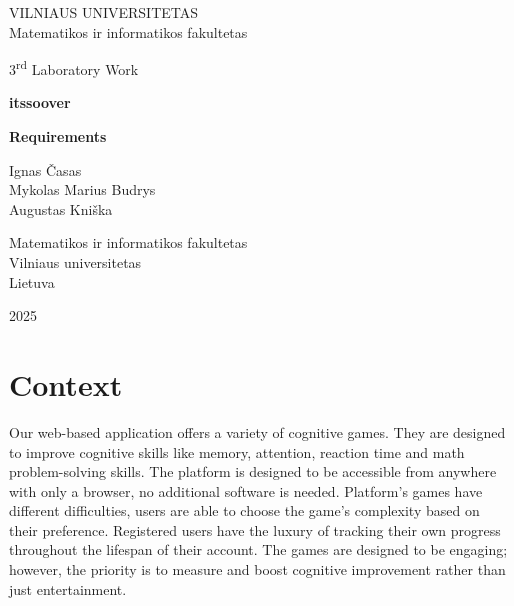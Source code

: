 \documentclass[11pt,a4paper]{article}
\begin{document}

\begin{titlepage}
    \centering
    \thispagestyle{empty}
    
    {\Large VILNIAUS UNIVERSITETAS\\
    Matematikos ir informatikos fakultetas}\par
    
    \vspace{3cm} %
    
    {\Large 3\textsuperscript{rd} Laboratory Work}\par
    \vspace{0.5cm}
    {\Large \textbf{itssoover}}\par
    {\Large \textbf{Requirements}}\par
    
    \vspace{3cm}
    
    {\large
    Ignas Časas\\
    Mykolas Marius Budrys\\
    Augustas Kniška
    }\par
    
    \vspace{8cm}
    
    {\large
    Matematikos ir informatikos fakultetas\\
    Vilniaus universitetas\\
    Lietuva
    }\par
    \vfill

    \large 2025
    
\end{titlepage}

\tableofcontents
\newpage

\section{Context}
Our web-based application offers a variety of cognitive games. They are designed to improve cognitive skills like memory, attention, reaction time and math problem-solving skills. The platform is designed to be  accessible from anywhere with only a browser, no additional software is needed. Platform's games have different difficulties, users are able to choose the game's complexity based on their preference. Registered users have the luxury of tracking their own progress throughout the lifespan of their account. The games are designed to be engaging; however, the priority is to measure and boost cognitive improvement rather than just entertainment.
\end{document}
